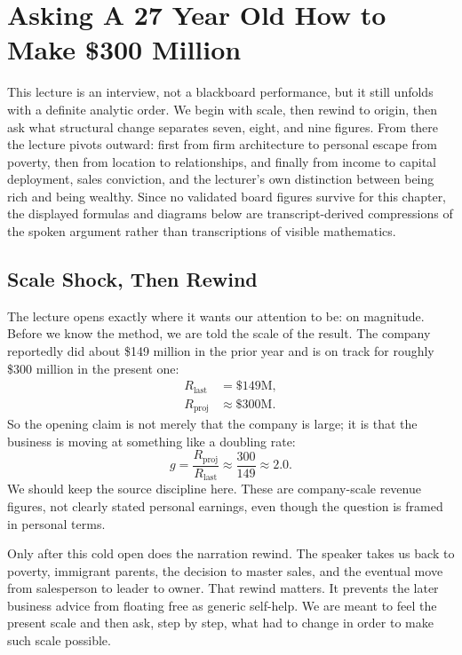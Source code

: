 \chapter{Asking A 27 Year Old How to Make \$300 Million}

This lecture is an interview, not a blackboard performance, but it still unfolds with a definite analytic order. We begin with scale, then rewind to origin, then ask what structural change separates seven, eight, and nine figures. From there the lecture pivots outward: first from firm architecture to personal escape from poverty, then from location to relationships, and finally from income to capital deployment, sales conviction, and the lecturer's own distinction between being rich and being wealthy. Since no validated board figures survive for this chapter, the displayed formulas and diagrams below are transcript-derived compressions of the spoken argument rather than transcriptions of visible mathematics.

\section{Scale Shock, Then Rewind}

The lecture opens exactly where it wants our attention to be: on magnitude. Before we know the method, we are told the scale of the result. The company reportedly did about \$149 million in the prior year and is on track for roughly \$300 million in the present one:
\begin{align}
R_{\text{last}} &= \$149\text{M},\\
R_{\text{proj}} &\approx \$300\text{M}.
\end{align}
So the opening claim is not merely that the company is large; it is that the business is moving at something like a doubling rate:
\begin{equation}
g=\frac{R_{\text{proj}}}{R_{\text{last}}}\approx \frac{300}{149}\approx 2.0.
\end{equation}
We should keep the source discipline here. These are company-scale revenue figures, not clearly stated personal earnings, even though the question is framed in personal terms.

Only after this cold open does the narration rewind. The speaker takes us back to poverty, immigrant parents, the decision to master sales, and the eventual move from salesperson to leader to owner. That rewind matters. It prevents the later business advice from floating free as generic self-help. We are meant to feel the present scale and then ask, step by step, what had to change in order to make such scale possible.

